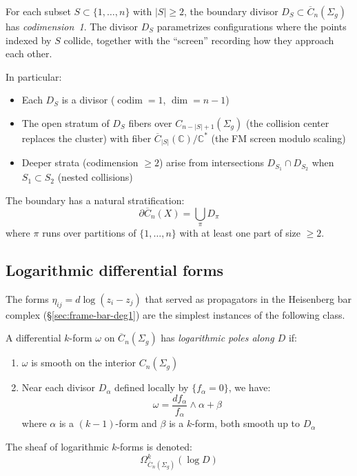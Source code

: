 \begin{corollary}\label{cor:dimension-strata}
For each subset $S \subset \{1,\ldots,n\}$ with $|S| \geq 2$, the boundary divisor
$D_S \subset \overline{C}_n(\Sigma_g)$ has \emph{codimension~1}. The divisor $D_S$
parametrizes configurations where the points indexed by $S$ collide, together with
the ``screen'' recording how they approach each other.

In particular:
\begin{itemize}
\item Each $D_S$ is a divisor ($\operatorname{codim} = 1$, $\dim = n-1$)
\item The open stratum of $D_S$ fibers over $C_{n-|S|+1}(\Sigma_g)$ (the collision
center replaces the cluster) with fiber $\overline{C}_{|S|}(\mathbb{C})/\mathbb{C}^*$
(the FM screen modulo scaling)
\item Deeper strata (codimension $\geq 2$) arise from intersections $D_{S_1} \cap D_{S_2}$
when $S_1 \subset S_2$ (nested collisions)
\end{itemize}
\end{corollary}

\begin{theorem}
\label{thm:boundary-stratification}
The boundary has a natural stratification:
\[\partial\overline{C}_n(X) = \bigcup_{\pi} D_\pi\]
where $\pi$ runs over partitions of $\{1, \ldots, n\}$ with at least one part of size $\geq 2$.
\end{theorem}

\subsection{Logarithmic differential forms}

\begin{definition}\label{def:log-forms}
The forms $\eta_{ij} = d\log(z_i - z_j)$ that served as propagators in the Heisenberg bar complex (\S\ref{sec:frame-bar-deg1}) are the simplest instances of the following class.

A differential $k$-form $\omega$ on $\overline{C}_n(\Sigma_g)$ has \emph{logarithmic poles along $D$} if:
\begin{enumerate}
\item $\omega$ is smooth on the interior $C_n(\Sigma_g)$
\item Near each divisor $D_\alpha$ defined locally by $\{f_\alpha = 0\}$, we have:
\[\omega = \frac{df_\alpha}{f_\alpha} \wedge \alpha + \beta\]
where $\alpha$ is a $(k-1)$-form and $\beta$ is a $k$-form, both smooth up to $D_\alpha$
\end{enumerate}

The sheaf of logarithmic $k$-forms is denoted:
\[\Omega^k_{\overline{C}_n(\Sigma_g)}(\log D)\]
\end{definition}

